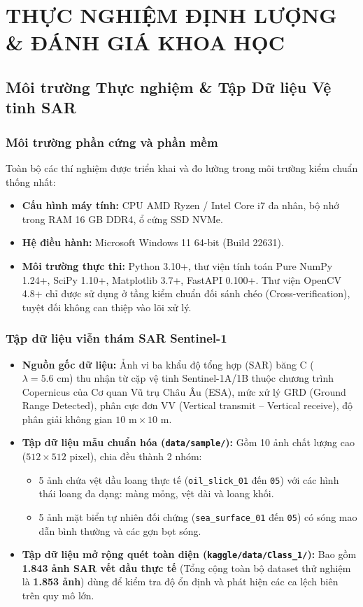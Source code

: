 \chapter{THỰC NGHIỆM ĐỊNH LƯỢNG \& ĐÁNH GIÁ KHOA HỌC}
\label{ch:thuc_nghiem}

\section{Môi trường Thực nghiệm \& Tập Dữ liệu Vệ tinh SAR}
\subsection{Môi trường phần cứng và phần mềm}
Toàn bộ các thí nghiệm được triển khai và đo lường trong môi trường kiểm chuẩn thống nhất:
\begin{itemize}
    \item \textbf{Cấu hình máy tính:} CPU AMD Ryzen / Intel Core i7 đa nhân, bộ nhớ trong RAM 16 GB DDR4, ổ cứng SSD NVMe.
    \item \textbf{Hệ điều hành:} Microsoft Windows 11 64-bit (Build 22631).
    \item \textbf{Môi trường thực thi:} Python 3.10+, thư viện tính toán Pure NumPy 1.24+, SciPy 1.10+, Matplotlib 3.7+, FastAPI 0.100+. Thư viện OpenCV 4.8+ chỉ được sử dụng ở tầng kiểm chuẩn đối sánh chéo (Cross-verification), tuyệt đối không can thiệp vào lõi xử lý.
\end{itemize}

\subsection{Tập dữ liệu viễn thám SAR Sentinel-1}
\begin{itemize}
    \item \textbf{Nguồn gốc dữ liệu:} Ảnh vi ba khẩu độ tổng hợp (SAR) băng C ($\lambda = 5.6\text{ cm}$) thu nhận từ cặp vệ tinh Sentinel-1A/1B thuộc chương trình Copernicus của Cơ quan Vũ trụ Châu Âu (ESA), mức xử lý GRD (Ground Range Detected), phân cực đơn VV (Vertical transmit -- Vertical receive), độ phân giải không gian $10\text{ m} \times 10\text{ m}$.
    \item \textbf{Tập dữ liệu mẫu chuẩn hóa (\texttt{data/sample/}):} Gồm 10 ảnh chất lượng cao ($512 \times 512$ pixel), chia đều thành 2 nhóm:
    \begin{itemize}
        \item 5 ảnh chứa vệt dầu loang thực tế (\texttt{oil\_slick\_01} đến \texttt{05}) với các hình thái loang đa dạng: màng mỏng, vệt dài và loang khối.
        \item 5 ảnh mặt biển tự nhiên đối chứng (\texttt{sea\_surface\_01} đến \texttt{05}) có sóng mao dẫn bình thường và các gợn bọt sóng.
    \end{itemize}
    \item \textbf{Tập dữ liệu mở rộng quét toàn diện (\texttt{kaggle/data/Class\_1/}):} Bao gồm \textbf{1.843 ảnh SAR vết dầu thực tế} (Tổng cộng toàn bộ dataset thử nghiệm là \textbf{1.853 ảnh}) dùng để kiểm tra độ ổn định và phát hiện các ca lệch biên trên quy mô lớn.
\end{itemize}



